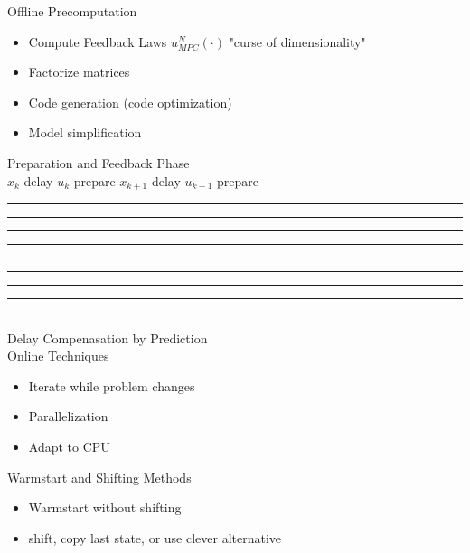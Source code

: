 \begin{tcolorbox}[colback=blue!5!white,colframe=blue!75!black,title=\textbf{Basics}]
Offline Precomputation
\begin{itemize}
	\item Compute Feedback Laws $u^N_{MPC} (\cdot)$ "curse of dimensionality"
	\item Factorize matrices
	\item Code generation (code optimization)
	\item Model simplification
\end{itemize}

Preparation and Feedback Phase\\
$x_k$ delay \hspace{.5mm} $u_k$ \hspace{.5cm}prepare \hspace{1.cm} $x_{k+1}$ delay $u_{k+1}$ \hspace{.2cm}prepare\\
{\textcolor{black}{\rule{1mm}{2mm}}}{\textcolor{red}{\rule{1.2cm}{1mm}}}{\textcolor{blue}{\rule{1mm}{2mm}}}{\textcolor{green}{\rule{3cm}{1mm}}}{\textcolor{black}{\rule{1mm}{2mm}}}{\textcolor{red}{\rule{1.2cm}{1mm}}}{\textcolor{blue}{\rule{1mm}{2mm}}}{\textcolor{green}{\rule{1.5cm}{1mm}}}\\
Delay Compenasation by Prediction\\
Online Techniques
\begin{itemize}
	\item Iterate while problem changes
	\item Parallelization
	\item Adapt to CPU
\end{itemize}

Warmstart and Shifting Methods
\begin{itemize}
	\item Warmstart without shifting
	\item shift, copy last state, or use clever alternative
\end{itemize}

\end{tcolorbox}


